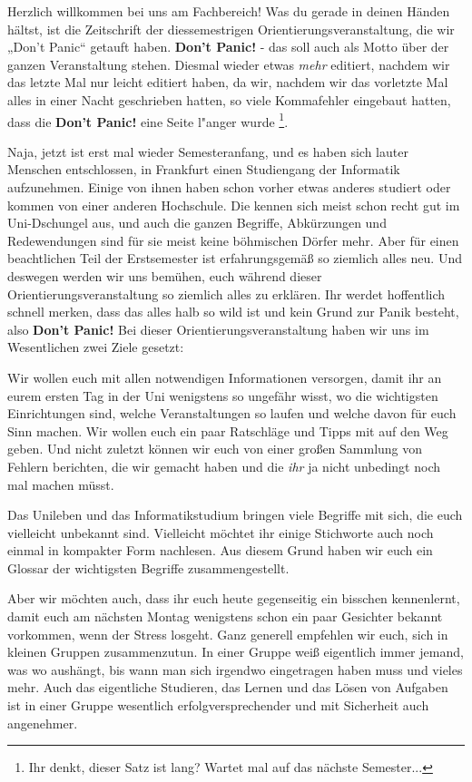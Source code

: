 \spaltenanfang
Herzlich willkommen bei uns am Fachbereich! Was du gerade in deinen Händen
hältst, ist die Zeitschrift der diessemestrigen Orientierungsveranstaltung, die
wir „Don’t Panic“ getauft haben. \textbf{Don’t Panic!} - das soll auch als
Motto über der ganzen Veranstaltung stehen. Diesmal wieder etwas \textsl{mehr} editiert, 
nachdem wir das letzte Mal nur leicht editiert haben, da wir, nachdem wir das 
vorletzte Mal alles in einer Nacht geschrieben hatten, so viele Kommafehler 
eingebaut hatten, dass die \textbf{Don't Panic!} eine Seite l"anger wurde
\footnote{Ihr denkt, dieser Satz ist lang? Wartet mal auf das nächste Semester...}. 


Naja, jetzt ist erst mal wieder Semesteranfang, und es haben sich lauter Menschen
entschlossen, in Frankfurt einen Studiengang der Informatik aufzunehmen. Einige
von ihnen haben schon vorher etwas anderes studiert oder kommen von einer anderen
Hochschule. Die kennen sich meist schon recht gut im Uni-Dschungel aus, und 
auch die ganzen Begriffe, Abkürzungen und Redewendungen sind für sie meist keine
böhmischen Dörfer mehr. Aber für einen beachtlichen Teil der Erstsemester ist
erfahrungsgemäß so ziemlich alles neu. Und deswegen werden wir uns bemühen,
euch während dieser Orientierungsveranstaltung so ziemlich alles zu erklären.
Ihr werdet hoffentlich schnell merken, dass das alles halb so wild ist und kein
Grund zur Panik besteht, also \textbf{Don’t Panic!} Bei dieser
Orientierungsveranstaltung haben wir uns im Wesentlichen zwei Ziele gesetzt:


Wir wollen euch mit allen notwendigen Informationen versorgen, damit ihr an
eurem ersten Tag in der Uni wenigstens so ungefähr wisst, wo die wichtigsten
Einrichtungen sind, welche Veranstaltungen so laufen und welche davon für euch
Sinn machen. Wir wollen euch ein paar Ratschläge und Tipps mit auf den Weg
geben. Und nicht zuletzt können wir euch von einer großen Sammlung von Fehlern
berichten, die wir gemacht haben und die \textsl{ihr} ja nicht unbedingt noch
mal machen müsst.


Das Unileben und das Informatikstudium bringen viele Begriffe mit sich, die
euch vielleicht unbekannt sind. Vielleicht möchtet ihr einige Stichworte auch
noch einmal in kompakter Form nachlesen. Aus diesem Grund haben wir euch ein
Glossar der wichtigsten Begriffe zusammengestellt.


Aber wir möchten auch, dass ihr euch heute gegenseitig ein
bisschen kennenlernt, damit euch am nächsten Montag wenigstens schon ein paar
Gesichter bekannt vorkommen, wenn der Stress losgeht. Ganz generell empfehlen
wir euch, sich in kleinen Gruppen zusammenzutun. In einer Gruppe weiß eigentlich
immer jemand, was wo aushängt, bis wann man sich irgendwo eingetragen haben
muss und vieles mehr. Auch das eigentliche Studieren, das Lernen und das Lösen
von Aufgaben ist in einer Gruppe wesentlich erfolgversprechender und mit
Sicherheit auch angenehmer.\\
\spaltenende
